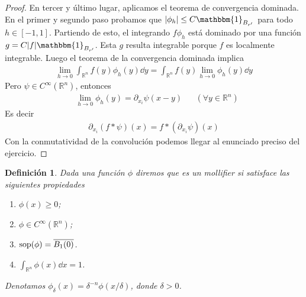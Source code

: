 \documentclass{article}
\newcommand{\characteristic}{\mathbbm{1}}
\newcommand{\realNumbers}{\mathbb{R}}
\newtheorem{definition}{Definición}
\DeclareMathOperator{\support}{\textnormal{sop}}
\theoremstyle{remark}
\begin{document}
\begin{proof}
  En tercer y último lugar, aplicamos el teorema de convergencia dominada.
  En el primer y segundo paso probamos que \(\abs{\phi_h} \leq C \characteristic_{B_{r'}}\) para todo \(h \in [- 1, 1]\).
  Partiendo de esto, el integrando \(f \phi_h\) está dominado por una función \(g = C \abs{f} \characteristic_{B_{r'}}\).
  Esta \(g\) resulta integrable porque \(f\) es localmente integrable.
  Luego el teorema de la convergencia dominada implica
  \begin{align}
    \lim_{h \rightarrow 0}
      \int_{\realNumbers^n} f(y) \phi_h(y) \dd y
    =
    \int_{\realNumbers^n}
      f(y)
      \lim_{h \rightarrow 0} \phi_h(y) \dd y
  \end{align}
  Pero \(\psi \in C^{\infty}(\realNumbers^n)\), entonces
  \begin{align}
    &\lim_{h \rightarrow 0} \phi_h(y) = \partial_{x_i} \psi (x - y)
    && (\forall y \in \realNumbers^n)
  \end{align}
  Es decir
  \begin{align}
    \partial_{x_i} (f * \psi) (x)
    =
    f * (\partial_{x_i} \psi) (x)
  \end{align}
  Con la conmutatividad de la convolución podemos llegar al enunciado preciso del ejercicio.
\end{proof}

\begin{definition}
  Dada una función \(\phi\) diremos que es un mollifier si satisface las siguientes propiedades
  \begin{enumerate}[label=\alph*)]
    \item \(\phi(x) \geq 0\);
    \item \(\phi \in C^{\infty}(\realNumbers^n)\);
    \item \(\support(\phi) = \overline{B_1(0)}\).
    \item \(\int_{\realNumbers^n} \phi(x) \dd x = 1\).
  \end{enumerate}
  Denotamos \(\phi_{\delta}(x) = \delta^{- n} \phi(x / \delta)\), donde \(\delta > 0\).
\end{definition}
\end{document}
